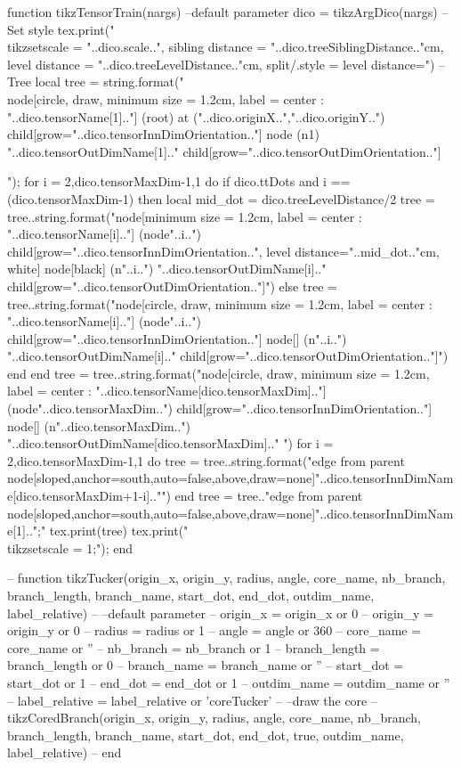 \begin{luacode*}
	function tikzTensorTrain(nargs)
		--default parameter
		dico = tikzArgDico(nargs)
		-- Set style
		tex.print("\\tikzset{scale = "..dico.scale..", sibling distance = "..dico.treeSiblingDistance.."cm, level distance = "..dico.treeLevelDistance.."cm, split/.style = {level distance=}}")
		-- Tree
		local tree = string.format("\\node[circle, draw, minimum size = 1.2cm, label = center : "..dico.tensorName[1].."] (root) at ("..dico.originX..","..dico.originY..") {} child[grow="..dico.tensorInnDimOrientation.."] {node (n1) {"..dico.tensorOutDimName[1].."}} child[grow="..dico.tensorOutDimOrientation.."]{");
		for i = 2,dico.tensorMaxDim-1,1 do
		   	if dico.ttDots and i == (dico.tensorMaxDim-1) then
				local mid_dot = dico.treeLevelDistance/2
			   tree = tree..string.format("node[minimum size = 1.2cm, label = center : "..dico.tensorName[i].."] (node"..i..") {} child[grow="..dico.tensorInnDimOrientation..", level distance="..mid_dot.."cm, white] {node[black] (n"..i..") {"..dico.tensorOutDimName[i].."}} child[grow="..dico.tensorOutDimOrientation.."]{")
		   	else
		   		tree = tree..string.format("node[circle, draw, minimum size = 1.2cm, label = center : "..dico.tensorName[i].."] (node"..i..") {} child[grow="..dico.tensorInnDimOrientation.."] {node[] (n"..i..") {"..dico.tensorOutDimName[i].."}} child[grow="..dico.tensorOutDimOrientation.."]{")
			end
		end
		tree = tree..string.format("node[circle, draw, minimum size = 1.2cm, label = center : "..dico.tensorName[dico.tensorMaxDim].."] (node"..dico.tensorMaxDim..") {} child[grow="..dico.tensorInnDimOrientation.."] {node[] (n"..dico.tensorMaxDim..") {"..dico.tensorOutDimName[dico.tensorMaxDim].."} }")
		for i = 2,dico.tensorMaxDim-1,1 do
		  tree = tree..string.format("edge from parent node[sloped,anchor=south,auto=false,above,draw=none]{"..dico.tensorInnDimName[dico.tensorMaxDim+1-i].."}}")
		end
		tree = tree.."edge from parent node[sloped,anchor=south,auto=false,above,draw=none]{"..dico.tensorInnDimName[1].."}};"
		tex.print(tree)
		tex.print("\\tikzset{scale = 1};");
	end
	
	-- function tikzTucker(origin_x, origin_y, radius, angle, core_name, nb_branch, branch_length, branch_name, start_dot, end_dot, outdim_name, label_relative)
	--   --default parameter
	--   origin_x = origin_x or 0
	--   origin_y = origin_y or 0
	--   radius = radius or 1
	--   angle = angle or 360
	--   core_name = core_name or ''
	--   nb_branch = nb_branch or 1
	--   branch_length = branch_length or 0
	--   branch_name = branch_name or ''
	--   start_dot = start_dot or 1
	--   end_dot = end_dot or 1
	--   outdim_name = outdim_name or ''
	--   label_relative = label_relative or 'coreTucker'
	--   --draw the core
	--   tikzCoredBranch(origin_x, origin_y, radius, angle, core_name, nb_branch, branch_length, branch_name, start_dot, end_dot, true, outdim_name, label_relative)
	-- end

}
\end{luacode*}
